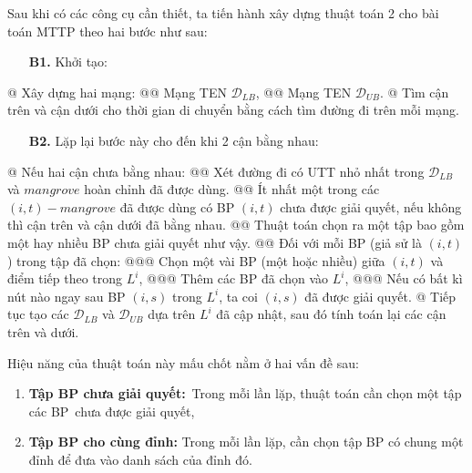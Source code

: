 \documentclass[../main.tex]{subfiles}
\begin{document}
Sau khi có các công cụ cần thiết, ta tiến hành xây dựng thuật toán 2 cho
bài toán MTTP theo hai bước như sau:



\begin{itemize}
  \item[\textbf{B1.}] Khởi tạo: 
\end{itemize}  
\begin{easylist}[itemize]
    @ Xây dựng hai mạng: 
        @@ Mạng TEN \(\mathcal D_{LB}\), 
        @@ Mạng TEN \(\mathcal D_{UB}\). 
    @ Tìm cận trên và cận dưới cho thời gian di chuyển bằng cách tìm đường đi trên mỗi mạng.
\end{easylist}

\begin{itemize}  
\item[\textbf{B2.}] Lặp lại bước này cho đến khi 2 cận bằng nhau: 
\end{itemize}
\begin{easylist}[itemize]
    @ Nếu hai cận chưa bằng nhau: 
        @@ Xét đường đi có UTT nhỏ nhất trong \(\mathcal D_{LB}\) và \(mangrove\) hoàn chỉnh đã được dùng. 
        @@ Ít nhất một trong các \((i,t)-mangrove\) đã được dùng có BP \((i,t)\) chưa được giải quyết, nếu không thì cận trên và cận dưới đã bằng nhau. 
        @@ Thuật toán chọn ra một tập bao gồm một hay nhiều BP chưa giải quyết như vậy.
        @@ Đối với mỗi BP (giả sử là \((i,t)\)) trong tập đã chọn: 
            @@@ Chọn một vài BP (một hoặc nhiều) giữa \((i,t)\) và điểm tiếp theo trong \(L^i\), 
            @@@ Thêm các BP đã chọn vào \(L^i\), 
            @@@ Nếu có bất kì nút nào ngay sau BP \((i,s)\) trong \(L^i\), ta coi \((i,s)\) đã được giải quyết. 
    @ Tiếp tục tạo các \(\mathcal D_{LB}\) và \(\mathcal D_{UB}\) dựa trên \(L^i\) đã cập nhật, sau đó tính toán lại các cận trên và dưới.
\end{easylist}

Hiệu năng của thuật toán này mấu chốt nằm ở hai vấn đề sau:

\begin{enumerate}
\def\labelenumi{\arabic{enumi}.}
\tightlist
\item
  \textbf{Tập BP chưa giải quyết:}~Trong mỗi lần lặp, thuật toán
  cần chọn một tập các BP~chưa được giải quyết,
\item
  \textbf{Tập BP cho cùng đỉnh:} Trong mỗi lần lặp, cần chọn tập
  BP có chung một đỉnh để đưa vào danh sách của đỉnh đó.
\end{enumerate}
\end{document}
